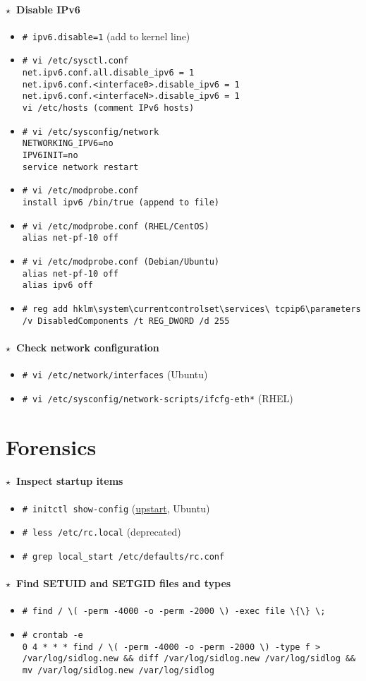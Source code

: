 \documentclass[10pt,landscape]{article}
\newcommand{\os}[1]{\texttt{\footnotesize{#1}}}
\newcommand{\unix}{\os{U}}
\newcommand{\freebsd}{\os{F}}
\newcommand{\linux}{\os{L}}
\newcommand{\windows}{\os{W}}
\newenvironment{action}[1]
  {\paragraph{$\star$~#1}\begin{itemize}[leftmargin=1cm]}
  {\end{itemize}}
\newcommand{\cmd}[2]{\item[#1] {\small\tt\# #2}}
\newcommand{\comment}[1]{\textrm{\small(#1)}}
\begin{document}
\begin{multicols*}{3}
\begin{action}{Disable IPv6}
\cmd{\linux}{ipv6.disable=1} \comment{add to kernel line}
\cmd{\linux}{vi /etc/sysctl.conf\\
  net.ipv6.conf.all.disable\_ipv6 = 1\\
  net.ipv6.conf.<interface0>.disable\_ipv6 = 1\\
  net.ipv6.conf.<interfaceN>.disable\_ipv6 = 1\\
  vi /etc/hosts \comment{comment IPv6 hosts}}
\cmd{\linux}{vi /etc/sysconfig/network\\
  NETWORKING\_IPV6=no\\
  IPV6INIT=no\\
  service network restart}
\cmd{\linux}{vi /etc/modprobe.conf\\
  install ipv6 /bin/true \comment{append to file}}
\cmd{\linux}{vi /etc/modprobe.conf  \comment{RHEL/CentOS}\\
  alias net-pf-10 off}
\cmd{\linux}{vi /etc/modprobe.conf \comment{Debian/Ubuntu}\\
  alias net-pf-10 off \\
  alias ipv6 off}
  \cmd{\windows}{reg add
  hklm{\textbackslash}system{\textbackslash}currentcontrolset{\textbackslash}services{\textbackslash}
  tcpip6{\textbackslash}parameters /v DisabledComponents /t REG\_DWORD /d 255}
\end{action}

\begin{action}{Check network configuration}
  \cmd{\linux}{vi /etc/network/interfaces} \comment{Ubuntu}
  \cmd{\linux}{vi /etc/sysconfig/network-scripts/ifcfg-eth*} \comment{RHEL}
\end{action}

\section*{Forensics}

\begin{action}{Inspect startup items}
\cmd{\linux}{initctl show-config}
  (\href{http://upstart.ubuntu.com/cookbook/upstart_cookbook.pdf}{upstart},
  Ubuntu)
\cmd{\freebsd}{less /etc/rc.local} (deprecated)
\cmd{\freebsd}{grep local\_start /etc/defaults/rc.conf}
\end{action}

\begin{action}{Find SETUID and SETGID files and types}
\cmd{\unix}{find / \textbackslash( -perm -4000 -o -perm -2000 \textbackslash)
  -exec file \textbackslash\{\textbackslash\} \textbackslash;}
\cmd{\unix}{crontab -e\\
  0 4 * * * find / \textbackslash( -perm -4000 -o -perm -2000 \textbackslash)
  -type f > /var/log/sidlog.new \&\&
  diff /var/log/sidlog.new /var/log/sidlog \&\&
  mv /var/log/sidlog.new /var/log/sidlog}
\end{action}


\end{multicols*}
\end{document}
